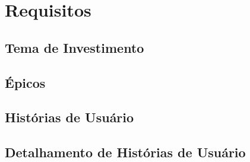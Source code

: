 \chapter[Requisitos]{Requisitos}

\section{Tema de Investimento}

\section{Épicos}

\section{Histórias de Usuário}

\section{Detalhamento de Histórias de Usuário}